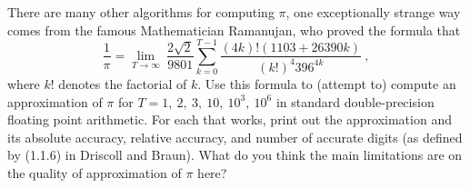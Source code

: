 \documentclass[11pt]{article}
\begin{document}
 There are many other algorithms for computing $\pi$, one exceptionally strange way comes from the famous Mathematician Ramanujan, who proved the formula that
$$ \frac {1}{\pi }= \lim_{T\rightarrow \infty} \ {\frac {2{\sqrt {2}}}{9801}}\sum _{k=0}^{T-1}{\frac {(4k)!(1103+26390k)}{(k!)^{4}396^{4k}}} \ , $$
where $k!$ denotes the factorial of $k$. Use this formula to (attempt to) compute an approximation of $\pi$ for $T=1,\ 2,\ 3, \ 10,\ 10^3,\ 10^6$ in standard double-precision floating point arithmetic. For each that works, print out the approximation and its absolute accuracy, relative accuracy, and number of accurate digits (as defined by (1.1.6) in Driscoll and Braun). What do you think the main limitations are on the quality of approximation of $\pi$ here?
\end{document}
